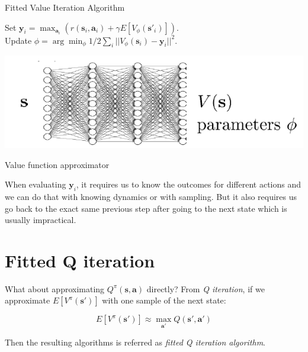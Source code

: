 \documentclass{tufte-handout}
\newcommand{\s}{\mathbf{s}}
\newcommand{\act}{\mathbf{a}}
\begin{document}
\begin{algorithm}

  \caption{Fitted Value Iteration Algorithm}
    \label{algo:fit-value}
    \begin{algorithmic}[1]
    \STATE Set $\mathbf{y}_i = \max_{\act_i} (r(\s_i, \act_i) +\gamma E[V_\phi(\s'_i)])$. \\
    \STATE Update $\phi = \arg \min_\phi 1/2 \sum_i || V_\phi(\s_i) - \mathbf{y}_i|| ^2 $. \\
    \ENDWHILE
  \end{algorithmic}
\end{algorithm}

\begin{marginfigure}
\label{fig:v-net}
\includegraphics[width=\linewidth]{v-net}
\caption{Value function approximator}
\end{marginfigure}

When evaluating $\mathbf{y}_i$, it requires us to know the outcomes for different actions and we can do that with knowing dynamics or with sampling. But
it also requires us go back to the exact same previous step after going to the next state which is usually impractical.

\section{Fitted Q iteration}

What about approximating $Q^\pi(\s, \act)$ directly? From \emph{Q iteration}, if we approximate $E[V^\pi(\s')]$ with one sample of the next state:

\begin{equation}
\label{eq:10}
E[V^\pi(\s')] \approx \max_{\act'} Q(\s', \act')
\end{equation}

Then the resulting algorithms is referred as \emph{fitted Q iteration algorithm}.
\end{document}
